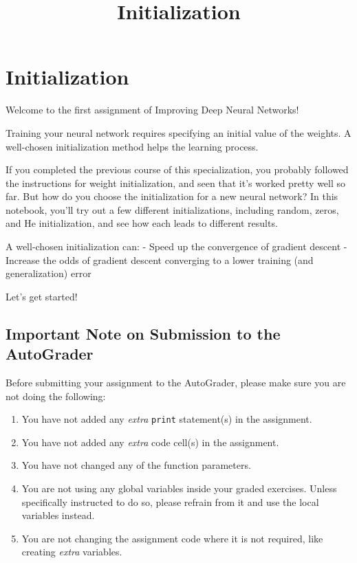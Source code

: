 \documentclass[11pt]{article}
\title{Initialization}
\providecommand{\tightlist}{%
      \setlength{\itemsep}{0pt}\setlength{\parskip}{0pt}}
\begin{document}
    
    \maketitle
    
    

    
    \hypertarget{initialization}{%
\section{Initialization}\label{initialization}}

Welcome to the first assignment of Improving Deep Neural Networks!

Training your neural network requires specifying an initial value of the
weights. A well-chosen initialization method helps the learning process.

If you completed the previous course of this specialization, you
probably followed the instructions for weight initialization, and seen
that it's worked pretty well so far. But how do you choose the
initialization for a new neural network? In this notebook, you'll try
out a few different initializations, including random, zeros, and He
initialization, and see how each leads to different results.

A well-chosen initialization can: - Speed up the convergence of gradient
descent - Increase the odds of gradient descent converging to a lower
training (and generalization) error

Let's get started!

\hypertarget{important-note-on-submission-to-the-autograder}{%
\subsection{Important Note on Submission to the
AutoGrader}\label{important-note-on-submission-to-the-autograder}}

Before submitting your assignment to the AutoGrader, please make sure
you are not doing the following:

\begin{enumerate}
\def\labelenumi{\arabic{enumi}.}
\tightlist
\item
  You have not added any \emph{extra} \texttt{print} statement(s) in the
  assignment.
\item
  You have not added any \emph{extra} code cell(s) in the assignment.
\item
  You have not changed any of the function parameters.
\item
  You are not using any global variables inside your graded exercises.
  Unless specifically instructed to do so, please refrain from it and
  use the local variables instead.
\item
  You are not changing the assignment code where it is not required,
  like creating \emph{extra} variables.
\end{enumerate}
\end{document}
